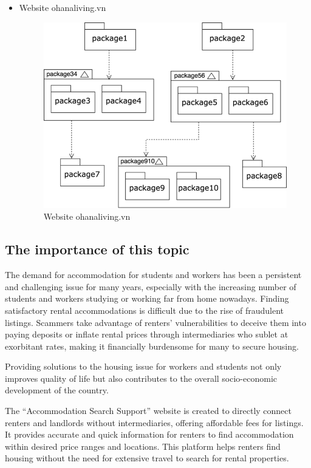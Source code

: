 \documentclass[../Main.tex]{subfiles}
\begin{document}
\begin{itemize}
\begin{figure}[H]
          \end{figure}
    \item Website ohanaliving.vn
          \begin{figure}[H]
              \centering
              \includegraphics{Figure/ohanaliving.png}
              \caption{Website ohanaliving.vn}
              \label{fig:ohanaliving}
          \end{figure}
\end{itemize}

\subsection{The importance of this topic}

The demand for accommodation for students and workers has been a persistent and challenging issue for many years, especially with the increasing number of students and workers studying or working far from home nowadays.
Finding satisfactory rental accommodations is difficult due to the rise of fraudulent listings.
Scammers take advantage of renters' vulnerabilities to deceive them into paying deposits or inflate rental prices through intermediaries who sublet at exorbitant rates, making it financially burdensome for many to secure housing.

Providing solutions to the housing issue for workers and students not only improves quality of life but also contributes to the overall socio-economic development of the country.

The ``Accommodation Search Support'' website is created to directly connect renters and landlords without intermediaries, offering affordable fees for listings.
It provides accurate and quick information for renters to find accommodation within desired price ranges and locations.
This platform helps renters find housing without the need for extensive travel to search for rental properties.
\end{document}
